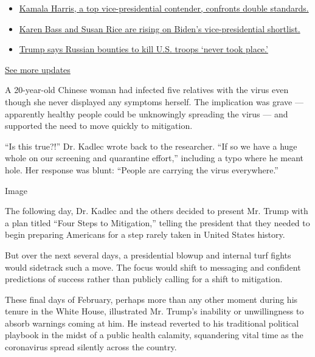 \begin{itemize}
\tightlist
\item
  \href{https://www.nytimes.com/2020/07/31/us/elections/biden-vs-trump.html?action=click\&pgtype=Article\&state=default\&region=MAIN_CONTENT_1\&context=storylines_live_updates\#link-29fdff45}{Kamala
  Harris, a top vice-presidential contender, confronts double
  standards.}
\item
  \href{https://www.nytimes.com/2020/07/31/us/elections/biden-vs-trump.html?action=click\&pgtype=Article\&state=default\&region=MAIN_CONTENT_1\&context=storylines_live_updates\#link-13ec3d9c}{Karen
  Bass and Susan Rice are rising on Biden's vice-presidential
  shortlist.}
\item
  \href{https://www.nytimes.com/2020/07/31/us/elections/biden-vs-trump.html?action=click\&pgtype=Article\&state=default\&region=MAIN_CONTENT_1\&context=storylines_live_updates\#link-49e9a016}{Trump
  says Russian bounties to kill U.S. troops `never took place.'}
\end{itemize}

\href{https://www.nytimes.com/2020/07/31/us/elections/biden-vs-trump.html?action=click\&pgtype=Article\&state=default\&region=MAIN_CONTENT_1\&context=storylines_live_updates}{See
more updates}

A 20-year-old Chinese woman had infected five relatives with the virus
even though she never displayed any symptoms herself. The implication
was grave --- apparently healthy people could be unknowingly spreading
the virus --- and supported the need to move quickly to mitigation.

``Is this true?!'' Dr. Kadlec wrote back to the researcher. ``If so we
have a huge whole on our screening and quarantine effort,'' including a
typo where he meant hole. Her response was blunt: ``People are carrying
the virus everywhere.''

Image

The following day, Dr. Kadlec and the others decided to present Mr.
Trump with a plan titled ``Four Steps to Mitigation,'' telling the
president that they needed to begin preparing Americans for a step
rarely taken in United States history.

But over the next several days, a presidential blowup and internal turf
fights would sidetrack such a move. The focus would shift to messaging
and confident predictions of success rather than publicly calling for a
shift to mitigation.

These final days of February, perhaps more than any other moment during
his tenure in the White House, illustrated Mr. Trump's inability or
unwillingness to absorb warnings coming at him. He instead reverted to
his traditional political playbook in the midst of a public health
calamity, squandering vital time as the coronavirus spread silently
across the country.

